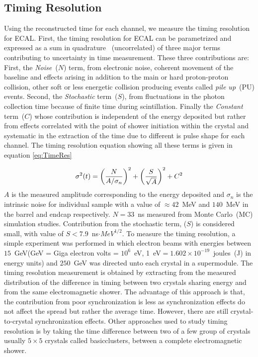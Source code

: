 \subsection{Timing Resolution}
Using the reconstructed time for each channel, we  measure the timing resolution for ECAL.
First, the timing resolution for ECAL can be parametrized and expressed as a sum in quadrature ~(uncorrelated) of three major terms contributing to uncertainty in time measurement. These three contributions are: First, the \textit{Noise}~($N$) term, from electronic noise, coherent movement of the baseline and effects arising in addition to the main or hard proton-proton collision, other soft or less energetic collision producing events called \textit{pile up}~(PU) events. Second, the \textit{Stochastic} term~($S$), from fluctuations in the photon collection time because of finite time during \pb scintillation. Finally the \textit{Constant} term~($C$) whose contribution is independent of the energy deposited but rather from effects correlated with the point of shower initiation within the crystal and systematic in the extraction of the time due to different is pulse shape for each channel.
The timing resolution equation showing all these terms is given in equation \ref{eq:TimeRes}

\begin{equation}{\label{eq:TimeRes}}
\sigma^{2}(t) = \left(\frac{N}{A/ \sigma_{n}}\right)^{2} + \left(\frac{S}{\sqrt{A}}\right)^{2} + C^{2}
\end{equation}
$A$ is the measured amplitude corresponding to the energy deposited and $\sigma_{n}$ is the intrinsic noise for individual sample with a value of $\approx 42$~MeV and $140$~MeV in the barrel and endcap respectively. $N = 33$~ns measured from Monte Carlo~(MC) simulation studies. Contribution from the stochastic term, ($S$) is considered small, with value of $S < 7.9$~ns$\cdot MeV^{1/2}$.
\newline
To measure the timing resolution, a simple experiment was performed in which electron beams with energies between $15$~GeV(GeV = Giga electron volts = $10^{6}$~eV, 1~eV$ = 1.602 \times 10^{-19}$~joules~(J) in energy units) and $250$~GeV was directed unto each crystal in a supermodule. The timing resolution measurement is obtained by extracting from the measured distribution of the difference in timing between two crystals sharing energy and from the same electromagnetic shower. The advantage of this approach is that, the contribution from poor synchronization is less as synchronization effects do not affect the spread but rather the average time. However, there are still crystal-to-crystal synchronization effects.
Other approaches used to study timing resolution is  by taking the time difference between two of a few group of crystals usually $5\times5$  crystals called basicclusters, between a complete electromagnetic shower.

